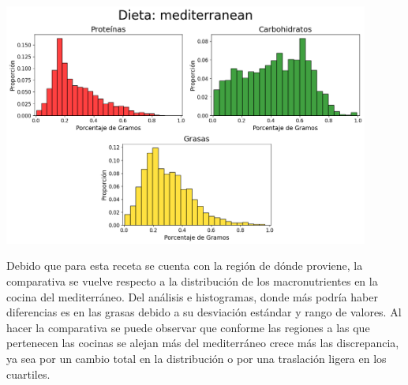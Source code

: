 \documentclass[12pt,a4paper]{article}
\begin{document}
            \begin{center}
                \includegraphics[width=0.90\textwidth]{Resources/2_03_plot_03.png}
            \end{center}

            Debido que para esta receta se cuenta con la región de dónde proviene, la 
            comparativa se vuelve respecto a la distribución de los macronutrientes en 
            la cocina del mediterráneo. Del análisis e histogramas, donde más podría haber 
            diferencias es en las grasas debido a su desviación estándar y rango de valores. 
            Al hacer la comparativa se puede observar que conforme las regiones a las que 
            pertenecen las cocinas se alejan más del mediterráneo crece más las discrepancia, 
            ya sea por un cambio total en la distribución o por una traslación ligera en los 
            cuartiles.
\end{document}
